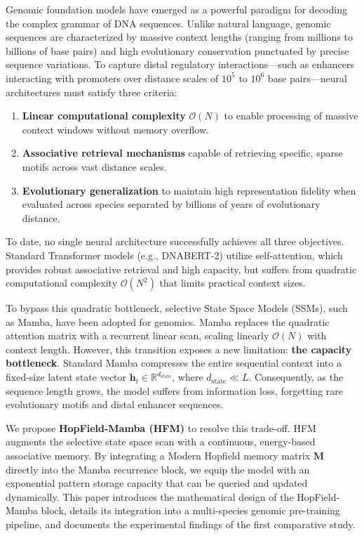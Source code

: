 \documentclass[journal,10pt]{IEEEtran}
\newcommand{\R}{\mathbb{R}}
\begin{document}
Genomic foundation models have emerged as a powerful paradigm for decoding the complex grammar of DNA sequences. Unlike natural language, genomic sequences are characterized by massive context lengths (ranging from millions to billions of base pairs) and high evolutionary conservation punctuated by precise sequence variations. To capture distal regulatory interactions—such as enhancers interacting with promoters over distance scales of $10^5$ to $10^6$ base pairs—neural architectures must satisfy three criteria:
\begin{enumerate}
    \item \textbf{Linear computational complexity} $\mathcal{O}(N)$ to enable processing of massive context windows without memory overflow.
    \item \textbf{Associative retrieval mechanisms} capable of retrieving specific, sparse motifs across vast distance scales.
    \item \textbf{Evolutionary generalization} to maintain high representation fidelity when evaluated across species separated by billions of years of evolutionary distance.
\end{enumerate}

To date, no single neural architecture successfully achieves all three objectives. Standard Transformer models (e.g., DNABERT-2) utilize self-attention, which provides robust associative retrieval and high capacity, but suffers from quadratic computational complexity $\mathcal{O}(N^2)$ that limits practical context sizes. 

To bypass this quadratic bottleneck, selective State Space Models (SSMs), such as Mamba, have been adopted for genomics. Mamba replaces the quadratic attention matrix with a recurrent linear scan, scaling linearly $\mathcal{O}(N)$ with context length. However, this transition exposes a new limitation: \textbf{the capacity bottleneck}. Standard Mamba compresses the entire sequential context into a fixed-size latent state vector $\bm{h}_t \in \R^{d_{\text{state}}}$, where $d_{\text{state}} \ll L$. Consequently, as the sequence length grows, the model suffers from information loss, forgetting rare evolutionary motifs and distal enhancer sequences.

We propose \textbf{HopField-Mamba (HFM)} to resolve this trade-off. HFM augments the selective state space scan with a continuous, energy-based associative memory. By integrating a Modern Hopfield memory matrix $\bm{M}$ directly into the Mamba recurrence block, we equip the model with an exponential pattern storage capacity that can be queried and updated dynamically. This paper introduces the mathematical design of the HopField-Mamba block, details its integration into a multi-species genomic pre-training pipeline, and documents the experimental findings of the first comparative study.
\end{document}
